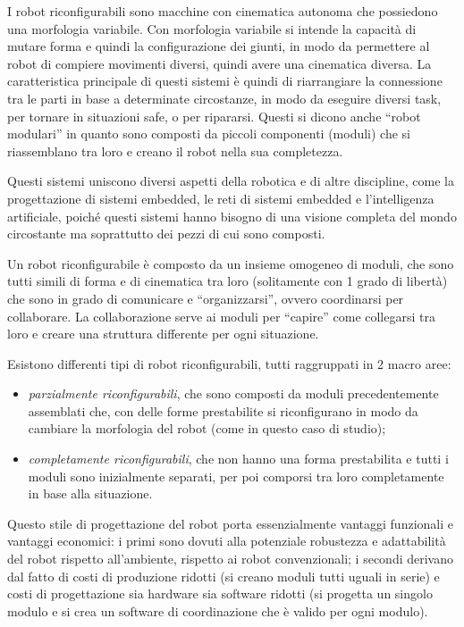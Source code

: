 \documentclass[a4paper,titlepage]{book}
\begin{document}
I robot riconfigurabili sono macchine con cinematica autonoma che possiedono una morfologia variabile. Con morfologia variabile si intende la capacità di mutare forma e quindi la configurazione dei giunti, in modo da permettere al robot di compiere movimenti diversi, quindi avere una cinematica diversa. La caratteristica principale di questi sistemi è quindi di riarrangiare la connessione tra le parti in base a determinate circostanze, in modo da eseguire diversi task, per tornare in situazioni safe, o per ripararsi.
Questi si dicono anche ``robot modulari'' in quanto sono composti da piccoli componenti (moduli) che si riassemblano tra loro e creano il robot nella sua completezza.

Questi sistemi uniscono diversi aspetti della robotica e di altre discipline, come la progettazione di sistemi embedded, le reti di sistemi embedded e l'intelligenza artificiale, poiché questi sistemi hanno bisogno di una visione completa del mondo circostante ma soprattutto dei pezzi di cui sono composti.

Un robot riconfigurabile è composto da un insieme omogeneo di moduli, che sono tutti simili di forma e di cinematica tra loro (solitamente con 1 grado di libertà) che sono in grado di comunicare e ``organizzarsi'', ovvero coordinarsi per collaborare. La collaborazione serve ai moduli per ``capire'' come collegarsi tra loro e creare una struttura differente per ogni situazione.

Esistono differenti tipi di robot riconfigurabili, tutti raggruppati in 2 macro aree:
\begin{itemize}
  \item \textit{parzialmente riconfigurabili}, che sono composti da moduli precedentemente assemblati che, con delle forme prestabilite si riconfigurano in modo da cambiare la morfologia del robot (come in questo caso di studio);
  \item \textit{completamente riconfigurabili}, che non hanno una forma prestabilita e tutti i moduli sono inizialmente separati, per poi comporsi tra loro completamente in base alla situazione.
\end{itemize}

Questo stile di progettazione del robot porta essenzialmente vantaggi funzionali e vantaggi economici: i primi sono dovuti alla potenziale robustezza e adattabilità del robot rispetto all'ambiente, rispetto ai robot convenzionali; i secondi derivano dal fatto di costi di produzione ridotti (si creano moduli tutti uguali in serie) e costi di progettazione sia hardware sia software ridotti (si progetta un singolo modulo e si crea un software di coordinazione che è valido per ogni modulo).
\end{document}
